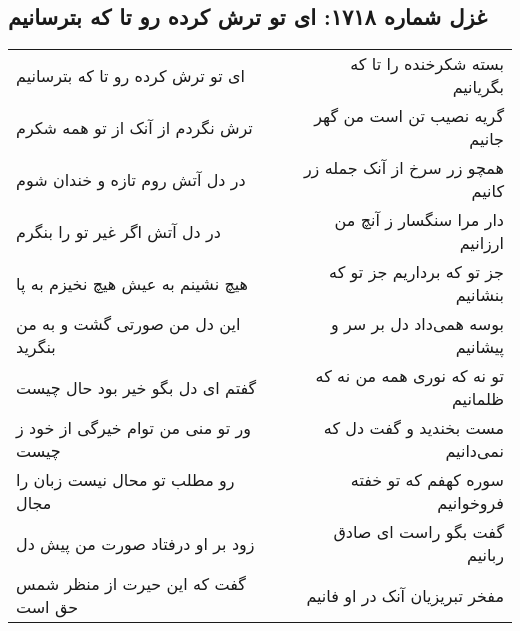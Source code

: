 \begin{center}
\section*{غزل شماره ۱۷۱۸: ای تو ترش کرده رو تا که بترسانیم}
\label{sec:1718}
\begin{longtable}{l p{0.5cm} r}
ای تو ترش کرده رو تا که بترسانیم
&&
بسته شکرخنده را تا که بگریانیم
\\
ترش نگردم از آنک از تو همه شکرم
&&
گریه نصیب تن است من گهر جانیم
\\
در دل آتش روم تازه و خندان شوم
&&
همچو زر سرخ از آنک جمله زر کانیم
\\
در دل آتش اگر غیر تو را بنگرم
&&
دار مرا سنگسار ز آنچ من ارزانیم
\\
هیچ نشینم به عیش هیچ نخیزم به پا
&&
جز تو که برداریم جز تو که بنشانیم
\\
این دل من صورتی گشت و به من بنگرید
&&
بوسه همی‌داد دل بر سر و پیشانیم
\\
گفتم ای دل بگو خیر بود حال چیست
&&
تو نه که نوری همه من نه که ظلمانیم
\\
ور تو منی من توام خیرگی از خود ز چیست
&&
مست بخندید و گفت دل که نمی‌دانیم
\\
رو مطلب تو محال نیست زبان را مجال
&&
سوره کهفم که تو خفته فروخوانیم
\\
زود بر او درفتاد صورت من پیش دل
&&
گفت بگو راست ای صادق ربانیم
\\
گفت که این حیرت از منظر شمس حق است
&&
مفخر تبریزیان آنک در او فانیم
\\
\end{longtable}
\end{center}
